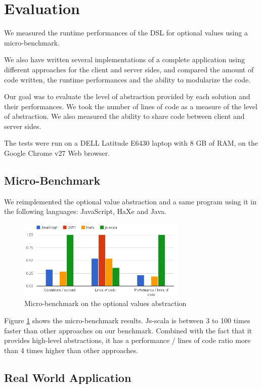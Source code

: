 \documentclass[preprint]{sigplanconf}
\begin{document}
\section{Evaluation}
\label{validation}

We measured the runtime performances of the DSL for optional values using a micro-benchmark.

We also have written several implementations of a complete application using different approaches for the client and
server sides, and compared the amount of code written, the runtime performances and the ability to modularize the
code.

Our goal was to evaluate the level of abstraction provided by each solution and their performances. We took the
number of lines of code as a measure of the level of abstraction. We also measured the ability to share code between
client and server sides.

The tests were run on a DELL Latitude E6430 laptop with 8 GB of RAM, on the Google Chrome v27 Web browser.

\subsection{Micro-Benchmark}

We reimplemented the optional value abstraction and a same program using it in the following languages: JavaScript,
HaXe and Java.

\begin{figure}
\centering
\includegraphics[width=8cm]{microbenchmark.png}
\caption{Micro-benchmark on the optional values abstraction}
\label{micro-benchmark}
\end{figure}

Figure \ref{micro-benchmark} shows the micro-benchmark results. Js-scala is between 3 to 100 times faster than
other approaches on our benchmark. Combined with the fact that it provides high-level abstractions, it has a
performance / lines of code ratio more than 4 times higher than other approaches.

\subsection{Real World Application}
\end{document}
